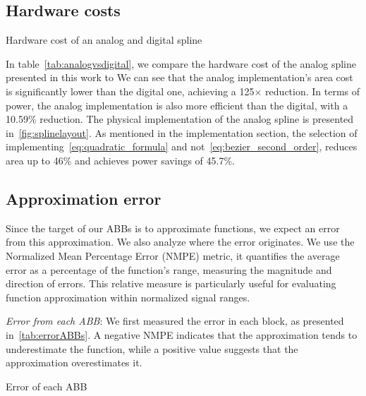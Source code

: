\subsection{Hardware costs}\label{sec:HardwareCosts}

\begin{table}
\centering
\caption{Hardware cost of an analog and digital spline}
\scalebox{1}{}
\vspace{-2ex}\label{tab:analogvsdigital}
\end{table}



In table~\autoref{tab:analogvsdigital}, we compare the hardware cost of the analog spline presented in this work to 
We can see that the analog implementation's area cost is significantly lower than the digital one, achieving a 125$\times$ reduction. In terms of power, the analog implementation is also more efficient than the digital, with a 10.59\% reduction.
The physical implementation of the analog spline is presented in~\autoref{fig:splinelayout}.
As mentioned in the implementation section, the selection of implementing~\autoref{eq:quadratic_formula} and not~\autoref{eq:bezier_second_order}, reduces area up to 46\% and achieves power savings of 45.7\%.

\subsection{Approximation error}

Since the target of our ABBs is to approximate functions, we expect an error from this approximation. 
We also analyze where the error originates. We use the Normalized Mean Percentage Error (NMPE) metric,  it quantifies the average error as a percentage of the function’s range, measuring the magnitude and direction of errors. 
This relative measure is particularly useful for evaluating function approximation within normalized signal ranges.

\textit{Error from each ABB}: We first measured the error in each block, as presented in~\autoref{tab:errorABBs}.
A negative NMPE indicates that the approximation tends to underestimate the function, while a positive value suggests that the approximation overestimates it.

\begin{table}
\centering
\caption{Error of each ABB}
\scalebox{1}{}
\vspace{-2ex}\label{tab:errorABBs}
\end{table}

